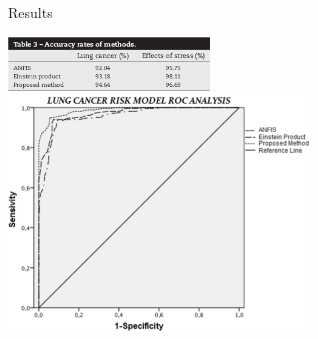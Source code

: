 \begin{frame}{Results}
  \begin{center}
    \includegraphics[width=0.4\textwidth]{img/accuracy.png}\\[0.5cm]
    \includegraphics[width=0.6\textwidth]{img/roc.png}
  \end{center}
\end{frame}




